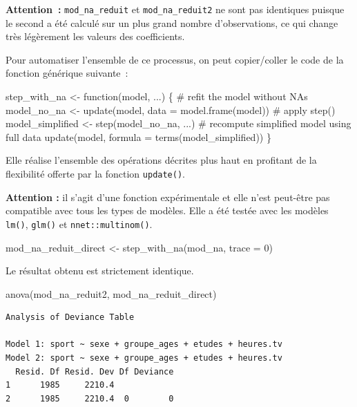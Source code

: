 \documentclass[
  letterpaper,
  DIV=11,
  numbers=noendperiod,
  oneside]{scrreprt}
\newenvironment{Shaded}{\begin{snugshade}}{\end{snugshade}}
\newcommand{\AttributeTok}[1]{\textcolor[rgb]{0.40,0.45,0.13}{#1}}
\newcommand{\CommentTok}[1]{\textcolor[rgb]{0.37,0.37,0.37}{#1}}
\newcommand{\ControlFlowTok}[1]{\textcolor[rgb]{0.00,0.23,0.31}{#1}}
\newcommand{\DecValTok}[1]{\textcolor[rgb]{0.68,0.00,0.00}{#1}}
\newcommand{\FunctionTok}[1]{\textcolor[rgb]{0.28,0.35,0.67}{#1}}
\newcommand{\NormalTok}[1]{\textcolor[rgb]{0.00,0.23,0.31}{#1}}
\newcommand{\OtherTok}[1]{\textcolor[rgb]{0.00,0.23,0.31}{#1}}
\begin{document}
\begin{tcolorbox}
\textbf{Attention~:} \texttt{mod\_na\_reduit} et
\texttt{mod\_na\_reduit2} ne sont pas identiques puisque le second a été
calculé sur un plus grand nombre d'observations, ce qui change très
légèrement les valeurs des coefficients.

Pour automatiser l'ensemble de ce processus, on peut copier/coller le
code de la fonction générique suivante~:

\begin{Shaded}
\begin{Highlighting}[]
\NormalTok{step\_with\_na }\OtherTok{\textless{}{-}} \ControlFlowTok{function}\NormalTok{(model, ...) \{}
  \CommentTok{\# refit the model without NAs}
\NormalTok{  model\_no\_na }\OtherTok{\textless{}{-}} \FunctionTok{update}\NormalTok{(model, }\AttributeTok{data =} \FunctionTok{model.frame}\NormalTok{(model))  }
  \CommentTok{\# apply step()}
\NormalTok{  model\_simplified }\OtherTok{\textless{}{-}} \FunctionTok{step}\NormalTok{(model\_no\_na, ...)}
  \CommentTok{\# recompute simplified model using full data}
  \FunctionTok{update}\NormalTok{(model, }\AttributeTok{formula =} \FunctionTok{terms}\NormalTok{(model\_simplified))}
\NormalTok{\}}
\end{Highlighting}
\end{Shaded}

Elle réalise l'ensemble des opérations décrites plus haut en profitant
de la flexibilité offerte par la fonction \texttt{update()}.

\textbf{Attention :} il s'agit d'une fonction expérimentale et elle
n'est peut-être pas compatible avec tous les types de modèles. Elle a
été testée avec les modèles \texttt{lm()}, \texttt{glm()} et
\texttt{nnet::multinom()}.

\begin{Shaded}
\begin{Highlighting}[]
\NormalTok{mod\_na\_reduit\_direct }\OtherTok{\textless{}{-}} \FunctionTok{step\_with\_na}\NormalTok{(mod\_na, }\AttributeTok{trace =} \DecValTok{0}\NormalTok{)}
\end{Highlighting}
\end{Shaded}

Le résultat obtenu est strictement identique.

\begin{Shaded}
\begin{Highlighting}[]
\FunctionTok{anova}\NormalTok{(mod\_na\_reduit2, mod\_na\_reduit\_direct)}
\end{Highlighting}
\end{Shaded}

\begin{verbatim}
Analysis of Deviance Table

Model 1: sport ~ sexe + groupe_ages + etudes + heures.tv
Model 2: sport ~ sexe + groupe_ages + etudes + heures.tv
  Resid. Df Resid. Dev Df Deviance
1      1985     2210.4            
2      1985     2210.4  0        0
\end{verbatim}

\end{tcolorbox}
\end{document}
